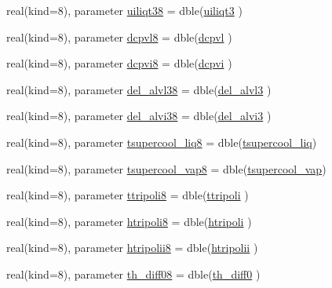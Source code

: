 \begin{DoxyCompactItemize}
real(kind=8), parameter \hyperlink{namespaceconsts__coms_a171bd610659557729762f52743c3af83}{uiliqt38} = dble(\hyperlink{namespaceconsts__coms_ab5c64cd18c9e5fddc92d34cbe5a75192}{uiliqt3} )
\item 
real(kind=8), parameter \hyperlink{namespaceconsts__coms_a4ec7b613e368deeeb7c1078b5d2f4cf1}{dcpvl8} = dble(\hyperlink{namespaceconsts__coms_a3d8b2bc618a2be7053f0eefeafff6646}{dcpvl} )
\item 
real(kind=8), parameter \hyperlink{namespaceconsts__coms_ae6c5bc2e2b10660ff626e4299ea10988}{dcpvi8} = dble(\hyperlink{namespaceconsts__coms_a2469770a4505b267d92ea0c4c78ba886}{dcpvi} )
\item 
real(kind=8), parameter \hyperlink{namespaceconsts__coms_a00a1e758e0133923e5be7fb331e8480f}{del\+\_\+alvl38} = dble(\hyperlink{namespaceconsts__coms_a809ce773fd38a8add21891c21a9a5e97}{del\+\_\+alvl3} )
\item 
real(kind=8), parameter \hyperlink{namespaceconsts__coms_ad9bb4be460a90b291f6e2a771e367880}{del\+\_\+alvi38} = dble(\hyperlink{namespaceconsts__coms_ac5a0f650b4707f552ab22cd6365257c2}{del\+\_\+alvi3} )
\item 
real(kind=8), parameter \hyperlink{namespaceconsts__coms_a2c9885214fcc467cea34fbde9e860607}{tsupercool\+\_\+liq8} = dble(\hyperlink{namespaceconsts__coms_ae511d0736cb1c546c00927c132cf9c9b}{tsupercool\+\_\+liq})
\item 
real(kind=8), parameter \hyperlink{namespaceconsts__coms_a60f7e49887cc212c75e63c51219699f1}{tsupercool\+\_\+vap8} = dble(\hyperlink{namespaceconsts__coms_a3872bd8b82e199fef7eb05add79a9a17}{tsupercool\+\_\+vap})
\item 
real(kind=8), parameter \hyperlink{namespaceconsts__coms_aa9842c494b90586e7930b5d2a86da71a}{ttripoli8} = dble(\hyperlink{namespaceconsts__coms_a7a8253ab1b6ed9a65304dcabc61587dd}{ttripoli} )
\item 
real(kind=8), parameter \hyperlink{namespaceconsts__coms_a75f7026b5529f3647a8f5787e0092c85}{htripoli8} = dble(\hyperlink{namespaceconsts__coms_a823cf4f0ac3ad6922988b3dd8cb809d2}{htripoli} )
\item 
real(kind=8), parameter \hyperlink{namespaceconsts__coms_a499d4c550c8f8a5e4f942f7def28d7cf}{htripolii8} = dble(\hyperlink{namespaceconsts__coms_a5d4d8f013ab8c773c7a3c4417e67af03}{htripolii} )
\item 
real(kind=8), parameter \hyperlink{namespaceconsts__coms_a26baa2bceffd0f1406090d5a3956fecb}{th\+\_\+diff08} = dble(\hyperlink{namespaceconsts__coms_a46eedb2769a2f899670b7245a8af4fa5}{th\+\_\+diff0} )

\end{DoxyCompactItemize}

